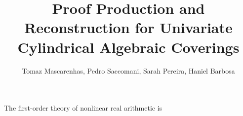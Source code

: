 \documentclass[12pt]{article}
\title{Proof Production and Reconstruction for Univariate Cylindrical Algebraic Coverings}
\author{Tomaz Mascarenhas\inst{1}, Pedro Saccomani\inst{1}, Sarah Pereira\inst{1}, Haniel Barbosa\inst{1}}
\begin{document}
 

\maketitle

The first-order theory of nonlinear real arithmetic is







\end{document}
